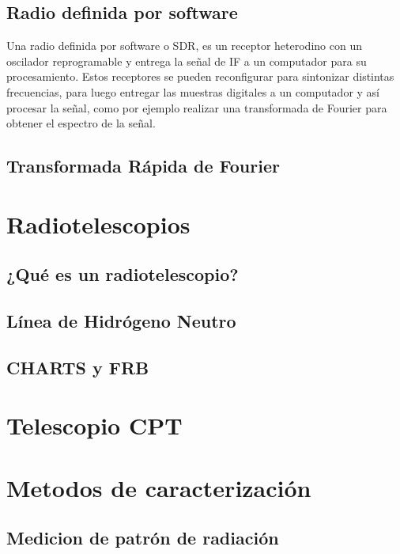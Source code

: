 \subsection{Radio definida por software}

Una radio definida por software o SDR, es un receptor heterodino con un oscilador reprogramable y entrega la señal de IF a un computador para su procesamiento. Estos receptores se pueden reconfigurar para sintonizar distintas frecuencias, para luego entregar las muestras digitales a un computador y así procesar la señal, como por ejemplo realizar una transformada de Fourier para obtener el espectro de la señal.\\

\subsection{Transformada Rápida de Fourier}


\section{Radiotelescopios}

\subsection{¿Qué es un radiotelescopio?}

\subsection{Línea de Hidrógeno Neutro}

\subsection{CHARTS y FRB}


\section{Telescopio CPT}

\section{Metodos de caracterización}

\subsection{Medicion de patrón de radiación}

